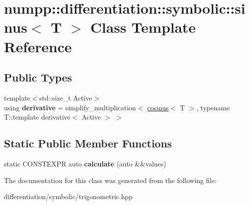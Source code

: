 \hypertarget{classnumpp_1_1differentiation_1_1symbolic_1_1sinus}{}\section{numpp\+:\+:differentiation\+:\+:symbolic\+:\+:sinus$<$ T $>$ Class Template Reference}
\label{classnumpp_1_1differentiation_1_1symbolic_1_1sinus}
\subsection*{Public Types}
\begin{DoxyCompactItemize}
\item 
\mbox{\label{classnumpp_1_1differentiation_1_1symbolic_1_1sinus_a5bde5934631bcfb972ad6c15c81ccca5}} 
{\footnotesize template$<$std\+::size\+\_\+t Active$>$ }\\using {\bfseries derivative} = simplify\+\_\+multiplication$<$ \hyperlink{classnumpp_1_1differentiation_1_1symbolic_1_1cosinus}{cosinus}$<$ T $>$, typename T\+::template derivative$<$ Active $>$ $>$
\end{DoxyCompactItemize}
\subsection*{Static Public Member Functions}
\begin{DoxyCompactItemize}
\item 
\mbox{\label{classnumpp_1_1differentiation_1_1symbolic_1_1sinus_a25872983c585075c533169136769caa7}} 
static C\+O\+N\+S\+T\+E\+X\+PR auto {\bfseries calculate} (auto \&\&values)
\end{DoxyCompactItemize}


The documentation for this class was generated from the following file\+:\begin{DoxyCompactItemize}
\item 
differentiation/symbolic/trigonometric.\+hpp\end{DoxyCompactItemize}
